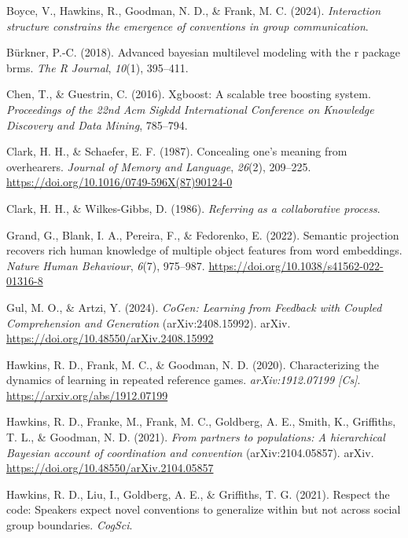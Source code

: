 \documentclass[10pt, letterpaper]{article}
\begin{document}
\label{refs}
\begin{CSLReferences}{1}{0}
Boyce, V., Hawkins, R., Goodman, N. D., \& Frank, M. C. (2024).
\emph{Interaction structure constrains the emergence of conventions in
group communication}.

Bürkner, P.-C. (2018). Advanced bayesian multilevel modeling with the r
package brms. \emph{The R Journal}, \emph{10}(1), 395--411.

Chen, T., \& Guestrin, C. (2016). Xgboost: {A} scalable tree boosting
system. \emph{Proceedings of the 22nd Acm Sigkdd International
Conference on Knowledge Discovery and Data Mining}, 785--794.

Clark, H. H., \& Schaefer, E. F. (1987). Concealing one's meaning from
overhearers. \emph{Journal of Memory and Language}, \emph{26}(2),
209--225. \url{https://doi.org/10.1016/0749-596X(87)90124-0}

Clark, H. H., \& Wilkes-Gibbs, D. (1986). \emph{Referring as a
collaborative process}.

Grand, G., Blank, I. A., Pereira, F., \& Fedorenko, E. (2022). Semantic
projection recovers rich human knowledge of multiple object features
from word embeddings. \emph{Nature Human Behaviour}, \emph{6}(7),
975--987. \url{https://doi.org/10.1038/s41562-022-01316-8}

Gul, M. O., \& Artzi, Y. (2024). \emph{{CoGen}: {Learning} from
{Feedback} with {Coupled Comprehension} and {Generation}}
(arXiv:2408.15992). arXiv.
\url{https://doi.org/10.48550/arXiv.2408.15992}

Hawkins, R. D., Frank, M. C., \& Goodman, N. D. (2020). Characterizing
the dynamics of learning in repeated reference games.
\emph{arXiv:1912.07199 {[}Cs{]}}. \url{https://arxiv.org/abs/1912.07199}

Hawkins, R. D., Franke, M., Frank, M. C., Goldberg, A. E., Smith, K.,
Griffiths, T. L., \& Goodman, N. D. (2021). \emph{From partners to
populations: {A} hierarchical {Bayesian} account of coordination and
convention} (arXiv:2104.05857). arXiv.
\url{https://doi.org/10.48550/arXiv.2104.05857}

Hawkins, R. D., Liu, I., Goldberg, A. E., \& Griffiths, T. G. (2021).
Respect the code: {Speakers} expect novel conventions to generalize
within but not across social group boundaries. \emph{CogSci}.


\end{CSLReferences}
\end{document}
